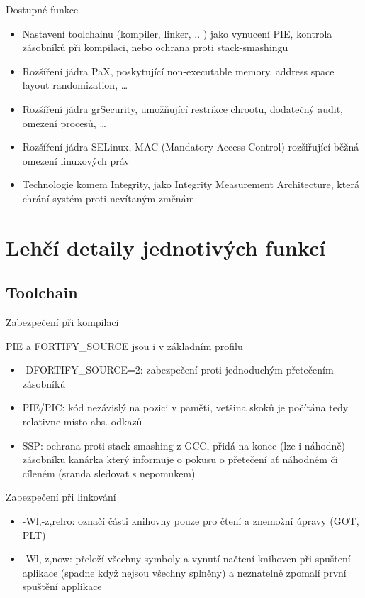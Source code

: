 \documentclass{beamer}
\begin{document}
\begin{frame}{Dostupné funkce}
	\begin{itemize}
		\item Nastavení toolchainu (kompiler, linker, .. ) jako vynucení PIE, kontrola zásobníků při kompilaci, nebo ochrana proti stack-smashingu
		\item Rozšíření jádra PaX, poskytující non-executable memory, address space layout randomization, \ldots
		\item Rozšíření jádra grSecurity, umožňující restrikce chrootu, dodatečný audit, omezení procesů, \ldots
		\item Rozšíření jádra SELinux, MAC (Mandatory Access Control) rozšiřující běžná omezení linuxových práv
		\item Technologie komem Integrity, jako Integrity Measurement Architecture, která chrání systém proti nevítaným změnám
	\end{itemize}
\end{frame}

\section{Lehčí detaily jednotivých funkcí}

\subsection{Toolchain}

\begin{frame}{Zabezpečení při kompilaci}
	\begin{center}PIE a FORTIFY\_SOURCE jsou i v základním profilu\end{center}
	\begin{itemize}
		\item -DFORTIFY\_SOURCE=2: zabezpečení proti jednoduchým přetečením zásobníků
		\item PIE/PIC: kód nezávislý na pozici v paměti, vetšina skoků je počítána tedy relativne místo abs. odkazů
		\item SSP: ochrana proti stack-smashing z GCC, přidá na konec (lze i náhodně) zásobníku kanárka který informuje o pokusu o přetečení ať náhodném či cíleném (sranda sledovat s nepomukem)
	\end{itemize}
\end{frame}

\begin{frame}{Zabezpečení při linkování}
	\begin{itemize}
		\item -Wl,-z,relro: označí části knihovny pouze pro čtení a znemožní úpravy (GOT, PLT)
		\item -Wl,-z,now: přeloží všechny symboly a vynutí načtení knihoven při spuštení aplikace (spadne když nejsou všechny splněny) a neznatelně zpomalí první spuštění applikace
	\end{itemize}
\end{frame}
\end{document}
